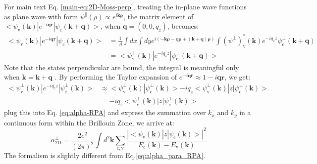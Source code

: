 \documentclass[journal=ancac3,email=true,hyperref=true,keywords=false]{achemso}
\begin{document}
For main text Eq. \ref{main-eq:2D-Moss-perp}, treating the in-plane
wave functions as plane wave with form
$\psi^{\parallel}(\rho) \propto e^{i \mathbf{k \rho}}$, the matrix
element of
$<\psi_{\mathrm{v}}(\mathbf{k})|e^{-i\mathbf{qr}}|\psi_{\mathrm{c}}(\mathbf{k+q})>$,
when $\mathbf{q}=(0, 0, q_{z})$, becomes\cite{Hybertsen_1987}:
\begin{equation}
  \begin{aligned}
    \label{eq:matrix-z}
  <\psi_{\mathrm{v}}(\mathbf{k})|e^{-i\mathbf{qr}}|\psi_{\mathrm{c}}(\mathbf{k+q})>
  &= \frac{1}{A} \int dx \int dy
  e^{i(\mathbf{-k \rho} - \mathbf{q \rho} + \mathbf{(k+q) \rho})}
  \int (\psi^{\perp})^{*}_{\mathrm{v}}(\mathbf{k})e^{-iq_{z}z}\psi^{\perp}_{\mathrm{c}}(\mathbf{k+q})\\
  &= <\psi^{\perp}_{\mathrm{v}}(\mathbf{k})|e^{-iq_{z}z}|\psi^{\perp}_{\mathrm{c}}(\mathbf{k+q})>
  \end{aligned}
\end{equation}
Note that the states perpendicular are bound, the integral is
meaningful only when $\mathbf{k=k+q}$ \cite{davies_physics_1997}. By
performing the Taylor expansion of
$e^{-i\mathbf{qr}} \approx 1 - i\mathbf{qr}$, we get:
\begin{equation}
  \begin{aligned}
    \label{eq:matrix-z-2}
    <\psi^{\perp}_{\mathrm{v}}(\mathbf{k})|e^{-iq_{z}z}|\psi^{\perp}_{\mathrm{c}}(\mathbf{k})>
    &\approx <\psi^{\perp}_{\mathrm{v}}(\mathbf{k})|\psi^{\perp}_{\mathrm{c}}(\mathbf{k})> -
    iq_{z} <\psi^{\perp}_{\mathrm{v}}(\mathbf{k})|z|\psi^{\perp}_{\mathrm{c}}(\mathbf{k})>\\
    &= -iq_{z} <\psi^{\perp}_{\mathrm{v}}(\mathbf{k})|z|\psi^{\perp}_{\mathrm{c}}(\mathbf{k})>
   \end{aligned}
\end{equation}
plug this into Eq. \ref{eq:alpha-RPA} and express the summation over
$k_{x}$ and $k_{y}$ in a continuous form within the Brillouin Zone, we
arrive at:
\begin{equation}
\label{eq:alpha_perp_RPA}
\alpha_{\mathrm{2D}}^{\perp} = \frac{2e^{2}}{(2 \pi) ^{2}} \int d^{2}\mathbf{k}
\sum_{\mathrm{c, v}}
\frac{|<\psi_{\mathrm{v}}(\mathbf{k})|z|\psi_{\mathrm{c}}(\mathbf{k})>|^{2}}
{E_{\mathrm{c}}(\mathbf{k}) - E_{\mathrm{v}}(\mathbf{k})}
\end{equation}
The formalism is slightly different from Eq.\ref{eq:alpha_para_RPA}.
\end{document}
